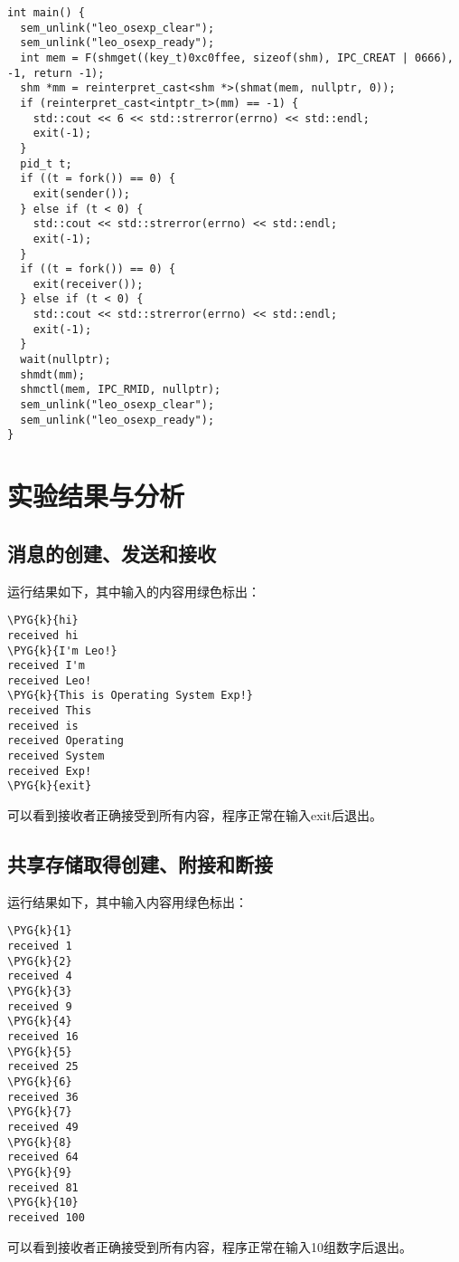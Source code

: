 \documentclass{ctexrep}
\begin{document}
\begin{verbatim}
int main() {
  sem_unlink("leo_osexp_clear");
  sem_unlink("leo_osexp_ready");
  int mem = F(shmget((key_t)0xc0ffee, sizeof(shm), IPC_CREAT | 0666), -1, return -1);
  shm *mm = reinterpret_cast<shm *>(shmat(mem, nullptr, 0));
  if (reinterpret_cast<intptr_t>(mm) == -1) {
    std::cout << 6 << std::strerror(errno) << std::endl;
    exit(-1);
  }
  pid_t t;
  if ((t = fork()) == 0) {
    exit(sender());
  } else if (t < 0) {
    std::cout << std::strerror(errno) << std::endl;
    exit(-1);
  }
  if ((t = fork()) == 0) {
    exit(receiver());
  } else if (t < 0) {
    std::cout << std::strerror(errno) << std::endl;
    exit(-1);
  }
  wait(nullptr);
  shmdt(mm);
  shmctl(mem, IPC_RMID, nullptr);
  sem_unlink("leo_osexp_clear");
  sem_unlink("leo_osexp_ready");
}
\end{verbatim}

\section{实验结果与分析}

\subsection{消息的创建、发送和接收}

运行结果如下，其中输入的内容用绿色标出：

\begin{Verbatim}[commandchars=\\\{\}]
\PYG{k}{hi}
received hi
\PYG{k}{I'm Leo!}
received I'm
received Leo!
\PYG{k}{This is Operating System Exp!}
received This
received is
received Operating
received System
received Exp!
\PYG{k}{exit}
\end{Verbatim}

可以看到接收者正确接受到所有内容，程序正常在输入exit后退出。

\subsection{共享存储取得创建、附接和断接}
运行结果如下，其中输入内容用绿色标出：
\begin{Verbatim}[commandchars=\\\{\}]
\PYG{k}{1}
received 1
\PYG{k}{2}
received 4
\PYG{k}{3}
received 9
\PYG{k}{4}
received 16
\PYG{k}{5}
received 25
\PYG{k}{6}
received 36
\PYG{k}{7}
received 49
\PYG{k}{8}
received 64
\PYG{k}{9}
received 81
\PYG{k}{10}
received 100
\end{Verbatim}
可以看到接收者正确接受到所有内容，程序正常在输入10组数字后退出。
\end{document}
